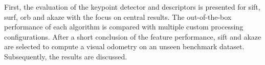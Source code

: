 First, the evaluation of the keypoint detector and descriptors is presented for \acrshort{sift}, \acrshort{surf}, \acrshort{orb} and \acrshort{akaze} with the focus on central results.
The out-of-the-box performance of each algorithm is compared with multiple custom processing configurations.
After a short conclusion of the feature performance, \acrshort{sift} and \acrshort{akaze} are selected to compute a visual odometry on an unseen benchmark dataset.
Subsequently, the results are discussed.
